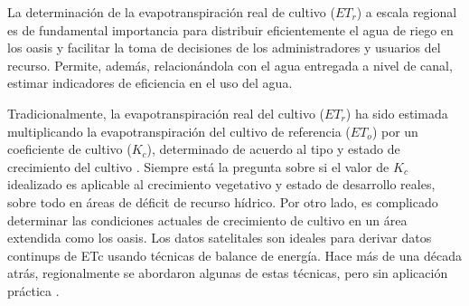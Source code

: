 \documentclass[]{article}
\begin{document}



La determinación de la evapotranspiración real de cultivo ($ET_r$) a escala regional es de fundamental importancia para distribuir eficientemente el agua de riego en los oasis y facilitar la toma de decisiones de los administradores y usuarios del recurso. Permite, además, relacionándola con el agua entregada a nivel de canal, estimar indicadores de eficiencia en el uso del agua. 

Tradicionalmente, la evapotranspiración real del cultivo ($ET_r$) ha sido estimada multiplicando la evapotranspiración del cultivo de referencia ($ET_o$) por un coeficiente de cultivo ($K_c$), determinado de acuerdo al tipo y estado de crecimiento del cultivo \citep{Allen2006}. Siempre está la pregunta sobre si el valor de $K_c$ idealizado es aplicable al crecimiento vegetativo y estado de desarrollo reales, sobre todo en áreas de déficit de recurso hídrico. Por otro lado, es complicado determinar las condiciones actuales de crecimiento de cultivo en un área extendida como los oasis. Los datos satelitales son ideales para derivar datos continups de ETc usando técnicas de balance de energía. Hace más de una década atrás, regionalmente se abordaron algunas de estas técnicas, pero sin aplicación práctica \citep{Bermejillo1998}. 
\end{document}
